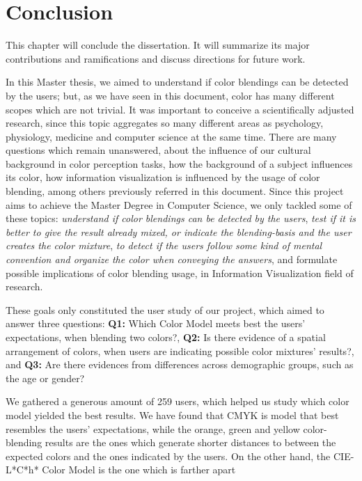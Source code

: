 
\chapter{Conclusion}
\label{chapter:conclusion}
%
This chapter will conclude the dissertation. It will summarize its major contributions and ramifications and discuss directions for future work. \par
%
In this Master thesis, we aimed to understand if color blendings can be detected by the users; but, as we have seen in this document, color has many
different scopes which are not trivial. It was important to conceive a scientifically adjusted research, since this topic aggregates so many different
areas as psychology, physiology, medicine and computer science at the same time. There are many questions which remain unanswered, about the influence
of our cultural background in color perception tasks, how the background of a subject influences its color, how information visualization is influenced
by the usage of color blending, among others previously referred in this document. Since this project aims to achieve the Master Degree in Computer
Science, we only tackled some of these topics: \emph{understand if color blendings can be detected by the users}, \emph{test if it is better to give
the result already mixed, or indicate the blending-basis and the user creates the color mixture}, \emph{to detect if the users follow some kind of
mental convention and organize the color when conveying the answers}, and formulate possible implications of color blending usage, in Information
Visualization field of research. \par
%
These goals only constituted the user study of our project, which aimed to answer three questions: \textbf{Q1:} Which Color Model meets best the users'
expectations, when blending two colors?, \textbf{Q2:} Is there evidence of a spatial arrangement of colors, when users are indicating possible color
mixtures' results?, and \textbf{Q3:} Are there evidences from differences across demographic groups, such as the age or gender? \par
%
We gathered a generous amount of 259 users, which helped us study which color model yielded the best results. We have found that CMYK is model that
best resembles the users' expectations, while the orange, green and yellow color-blending results are the ones which generate shorter distances to
between the expected colors and the ones indicated by the users. On the other hand, the CIE-L*C*h* Color Model is the one which is farther apart
